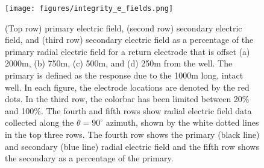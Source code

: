 \begin{figure}
    \begin{center}
    \texttt{[image: figures/integrity\_e\_fields.png]}
    \end{center}
\caption{
    (Top row) primary electric field, (second row) secondary electric field,
    and (third row) secondary electric field as a percentage of the primary radial electric field
    for a return electrode that is offset (a) 2000m, (b) 750m, (c) 500m, and (d) 250m
    from the well. The primary is defined as the response due to the 1000m
    long, intact well. In each figure, the electrode locations are denoted by
    the red dots. In the third row, the colorbar has been limited
    between 20\% and 100\%. The fourth and fifth rows show radial electric field data
    collected along the $\theta=90^\circ$ azimuth, shown by the white dotted lines in
    the top three rows. The fourth row shows the primary (black line) and secondary (blue line)
    radial electric field and the fifth row shows the secondary as a percentage of the primary.
}
\label{fig:integrity_e_fields}
\end{figure}
